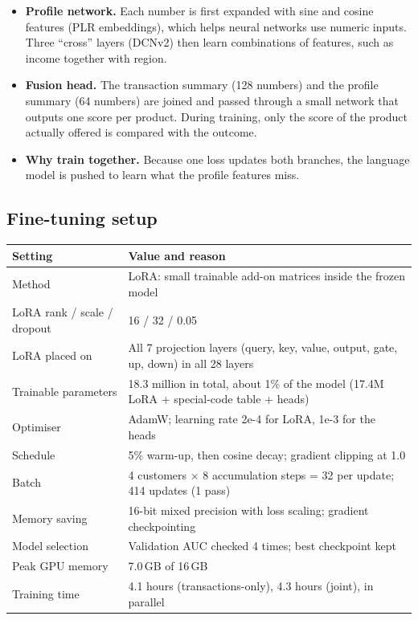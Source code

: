 \documentclass[10pt,a4paper]{article}
\begin{document}
\begin{itemize}
\item \textbf{Profile network.} Each number is first expanded with sine and cosine features (PLR embeddings), which helps neural networks use numeric inputs. Three ``cross'' layers (DCNv2) then learn combinations of features, such as income together with region.
\item \textbf{Fusion head.} The transaction summary (128 numbers) and the profile summary (64 numbers) are joined and passed through a small network that outputs one score per product. During training, only the score of the product actually offered is compared with the outcome.
\item \textbf{Why train together.} Because one loss updates both branches, the language model is pushed to learn what the profile features miss.
\end{itemize}

\subsection{Fine-tuning setup}
\begin{tabularx}{\linewidth}{@{}L{4.3cm}X@{}}
\toprule
\textbf{Setting} & \textbf{Value and reason} \\
\midrule
Method & LoRA: small trainable add-on matrices inside the frozen model \\
LoRA rank / scale / dropout & 16 / 32 / 0.05 \\
LoRA placed on & All 7 projection layers (query, key, value, output, gate, up, down) in all 28 layers \\
Trainable parameters & 18.3 million in total, about 1\% of the model (17.4M LoRA + special-code table + heads) \\
Optimiser & AdamW; learning rate 2e-4 for LoRA, 1e-3 for the heads \\
Schedule & 5\% warm-up, then cosine decay; gradient clipping at 1.0 \\
Batch & 4 customers $\times$ 8 accumulation steps = 32 per update; 414 updates (1 pass) \\
Memory saving & 16-bit mixed precision with loss scaling; gradient checkpointing \\
Model selection & Validation AUC checked 4 times; best checkpoint kept \\
Peak GPU memory & 7.0\,GB of 16\,GB \\
Training time & 4.1 hours (transactions-only), 4.3 hours (joint), in parallel \\
\bottomrule
\end{tabularx}
\end{document}
